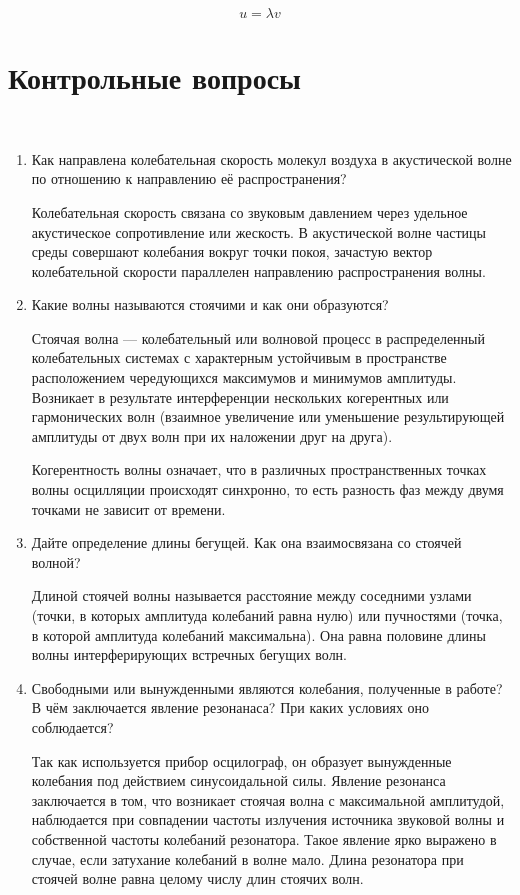 \documentclass[12pt,a4paper]{article}%
\begin{document}
\begin{equation}
u = \lambda v
\end{equation}

\section*{Контрольные вопросы}
\
\\
\begin{enumerate}
	\item Как направлена колебательная скорость молекул воздуха в акустической волне по отношению к направлению её распространения?
	
	Колебательная скорость связана со звуковым давлением через удельное акустическое сопротивление или жескость. В акустической волне частицы среды совершают колебания вокруг точки покоя, зачастую вектор колебательной скорости параллелен направлению распространения волны.
	
	\item Какие волны называются стоячими и как они образуются?
	
	Стоячая волна --- колебательный или волновой процесс в распределенный колебательных системах с характерным устойчивым в пространстве расположением чередующихся максимумов и минимумов амплитуды. Возникает в результате интерференции нескольких когерентных или гармонических волн (взаимное увеличение или уменьшение результирующей амплитуды от двух волн при их наложении друг на друга).
	
	Когерентность волны означает, что в различных пространственных точках волны осцилляции происходят синхронно, то есть разность фаз между двумя точками не зависит от времени.
	
	\item Дайте определение длины бегущей. Как она взаимосвязана со стоячей волной?
	
	Длиной стоячей волны называется расстояние между соседними узлами (точки, в которых амплитуда колебаний равна нулю) или пучностями (точка, в которой амплитуда колебаний максимальна). Она равна половине длины волны интерферирующих встречных бегущих волн.
	
	\item  Свободными или вынужденными являются колебания, полученные в работе? В чём заключается явление резонанаса? При каких условиях оно соблюдается?
	
	Так как используется прибор осцилограф, он образует вынужденные колебания под действием синусоидальной силы. Явление резонанса заключается в том, что возникает стоячая волна с максимальной амплитудой, наблюдается при совпадении частоты излучения источника звуковой волны и собственной частоты колебаний резонатора. Такое явление ярко выражено в случае, если затухание колебаний в волне мало. Длина резонатора при стоячей волне равна целому числу длин стоячих волн.
	

\end{enumerate}
\end{document}
